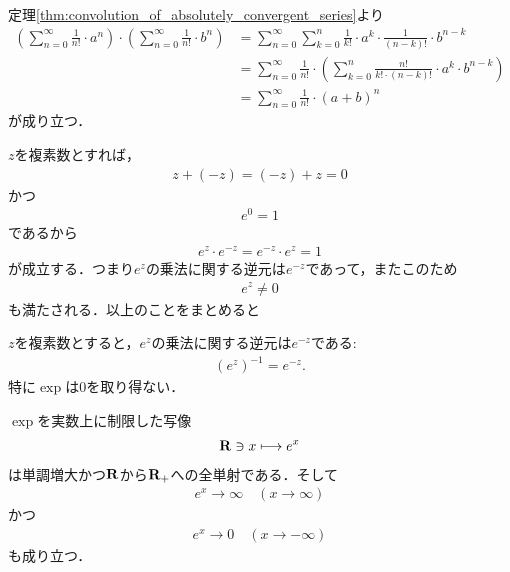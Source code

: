 	\begin{sketch}
		定理\ref{thm:convolution_of_absolutely_convergent_series}より
		\begin{align}
			\left(\sum_{n=0}^\infty \frac{1}{n!} \cdot a^n\right) \cdot \left(\sum_{n=0}^\infty \frac{1}{n!} \cdot b^n\right)
			&= \sum_{n=0}^\infty \sum_{k=0}^n \frac{1}{k!} \cdot a^k \cdot \frac{1}{(n-k)!} \cdot b^{n-k} \\
			&= \sum_{n=0}^\infty \frac{1}{n!} \cdot \left( \sum_{k=0}^n \frac{n!}{k! \cdot (n-k)!} \cdot a^k \cdot b^{n-k} \right) \\
			&= \sum_{n=0}^\infty \frac{1}{n!} \cdot (a+b)^n
		\end{align}
		が成り立つ．
		\QED
	\end{sketch}
	
	$z$を複素数とすれば，
	\begin{align}
		z + (-z) = (-z) + z = 0
	\end{align}
	かつ
	\begin{align}
		e^0 = 1
	\end{align}
	であるから
	\begin{align}
		e^z \cdot e^{-z} = e^{-z} \cdot e^z = 1
	\end{align}
	が成立する．つまり$e^{z}$の乗法に関する逆元は$e^{-z}$であって，またこのため
	\begin{align}
		e^{z} \neq 0
	\end{align}
	も満たされる．以上のことをまとめると
	
	\begin{screen}
		\begin{thm}[$e$のマイナス乗は逆元]\label{thm:inversion_of_exp_z_is_exp_minus_z}
			$z$を複素数とすると，$e^z$の乗法に関する逆元は$e^{-z}$である:
			\begin{align}
				(e^z)^{-1} = e^{-z}.
			\end{align}
			特に$\exp$は$0$を取り得ない．
		\end{thm}
	\end{screen}
	
	\begin{screen}
		\begin{thm}[指数関数は実数上で単調増大かつ一対一対応]\label{thm:real_valued_exponential_function}
			$\exp$を実数上に制限した写像
			\begin{align}
				\mathbf{R} \ni x \longmapsto e^x
			\end{align}
			は単調増大かつ$\mathbf{R}$から$\mathbf{R}_+$への全単射である．そして
			\begin{align}
				e^x \longrightarrow \infty \quad (x \longrightarrow \infty)
			\end{align}
			かつ
			\begin{align}
				e^x \longrightarrow 0 \quad (x \longrightarrow -\infty)
			\end{align}
			も成り立つ．
		\end{thm}
	\end{screen}
	
